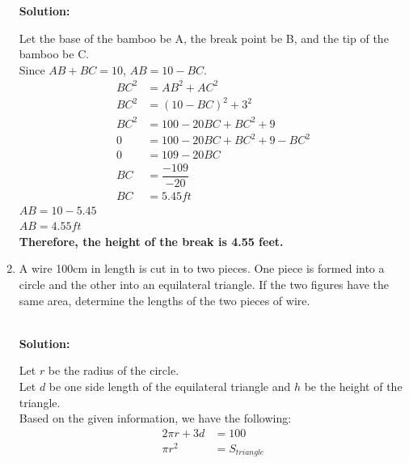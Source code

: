 \documentclass[12pt]{book}
\begin{document}
\begin{enumerate}
\textbf{Solution:}

Let the base of the bamboo be A, the break point be B, and the tip of the bamboo be C.\\
Since $AB + BC = 10$, $AB = 10 - BC$.
\begin{align*}
    BC^2 &= AB^2 + AC^2\\
    BC^2 &= (10 - BC)^2 + 3^2\\
    BC^2 &= 100 - 20BC + BC^2 + 9\\
    0 &= 100 - 20BC + BC^2 + 9 - BC^2\\
    0 &= 109 - 20BC\\
    BC &= \dfrac{-109}{-20}\\
    BC &= 5.45 ft
\end{align*}
$AB = 10 - 5.45$\\
$AB = 4.55 ft$\\

\textbf{Therefore, the height of the break is 4.55 feet.}

\newpage

\item A wire 100cm in length is cut in to two pieces. One piece is formed into a circle and the other into an equilateral triangle. If the two figures have the same area, determine the lengths of the two pieces of wire.\\
\\

\textbf{Solution:}

Let $r$ be the radius of the circle.\\
Let $d$ be one side length of the equilateral triangle and $h$ be the height of the triangle.\\
Based on the given information, we have the following:
\begin{align*}
    2\pi r + 3d &=  100\\
    \pi r^2 &=  S_{triangle}
\end{align*}



\end{enumerate}
\end{document}
